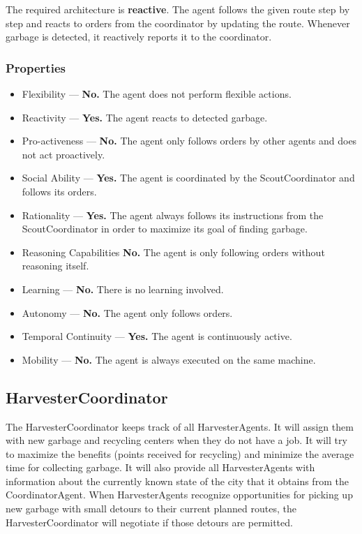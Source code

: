 The required architecture is \textbf{reactive}. The agent follows the given route step by step and reacts to orders from the coordinator by updating the route. Whenever garbage is detected, it reactively reports it to the coordinator.

\subsubsection*{Properties}

\begin{itemize}
	\item Flexibility — \textbf{No.} The agent does not perform flexible actions.
	\item Reactivity — \textbf{Yes.} The agent reacts to detected garbage.
	\item Pro-activeness — \textbf{No.} The agent only follows orders by other agents and does not act proactively.
	\item Social Ability — \textbf{Yes.} The agent is coordinated by the ScoutCoordinator and follows its orders.
	\item Rationality — \textbf{Yes.} The agent always follows its instructions from the ScoutCoordinator in order to maximize its goal of finding garbage.
	\item Reasoning Capabilities \textbf{No.} The agent is only following orders without reasoning itself.
	\item Learning — \textbf{No.} There is no learning involved.
	\item Autonomy — \textbf{No.} The agent only follows orders.
	\item Temporal Continuity — \textbf{Yes.} The agent is continuously active.
	\item Mobility — \textbf{No.} The agent is always executed on the same machine.
\end{itemize}

\subsection{HarvesterCoordinator}

The HarvesterCoordinator keeps track of all HarvesterAgents. It will assign them with new garbage and recycling centers when they do not have a job. It will try to maximize the benefits (points received for recycling) and minimize the average time for collecting garbage. It will also provide all HarvesterAgents with information about the currently known state of the city that it obtains from the CoordinatorAgent. When HarvesterAgents recognize opportunities for picking up new garbage with small detours to their current planned routes, the HarvesterCoordinator will negotiate if those detours are permitted.

